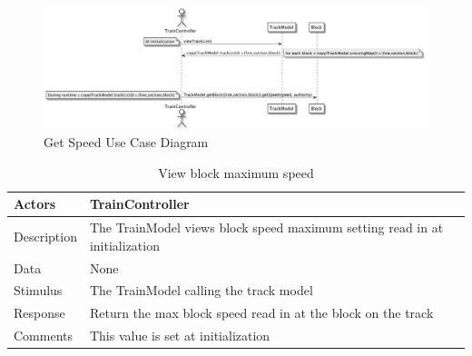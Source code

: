 \documentclass[]{article}
\begin{document}
\begin{figure}[H]
	\centering
	\includegraphics[scale=.5]{getSpeed.png}
	\caption{Get Speed Use Case Diagram}
\end{figure}
\begin{table}[H]
	\centering
	\caption{View block maximum speed}
	\begin{tabular}{|l|l|}
		\hline
		Actors & \parbox[t]{10cm}{TrainController} \\ \hline
		Description & \parbox[t]{10cm}{The TrainModel views block speed maximum setting read in at initialization} \\ \hline
		Data &  \parbox[t]{10cm}{None} \\ \hline
		Stimulus &  \parbox[t]{10cm}{The TrainModel calling the track model} \\ \hline
		Response & \parbox[t]{10cm}{Return the max block speed read in at the block on the track}\\ \hline
		Comments & \parbox[t]{10cm}{This value is set at initialization}  \\ \hline
	\end{tabular}
\end{table}
\end{document}
